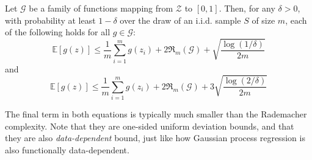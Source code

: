 \begin{theorem}
    Let $\mathcal{G}$ be a family of functions mapping from $\mathcal{Z}$ to $[0,1]$. Then, for any $\delta > 0$, with probability at least $1-\delta$ over the draw of an i.i.d. sample $S$ of size $m$, each of the following holds for all $g\in \mathcal{G}$: 
    \begin{equation}\label{ref:3.x}
        \mathbb{E}[g(z)] \leq \frac{1}{m} \sum^{m}_{i=1} g(z_{i}) + 2\mathfrak{R}_{m}(\mathcal{G}) + \sqrt{\frac{\log(1/\delta)}{2m}}
    \end{equation}
    and 
    \begin{equation}\label{ref:3.x1}
        \mathbb{E}[g(z)] \leq \frac{1}{m} \sum^{m}_{i=1} g(z_{i}) + 2\mathfrak{R}_{m}(\mathcal{G}) + 3\sqrt{\frac{\log(2/\delta)}{2m}}
    \end{equation}
\end{theorem}
The final term in both equations is typically much smaller than the Rademacher complexity. Note that they are one-sided uniform deviation bounds, and that they are also \textit{data-dependent} bound, just like how Gaussian process regression is also functionally data-dependent. 
